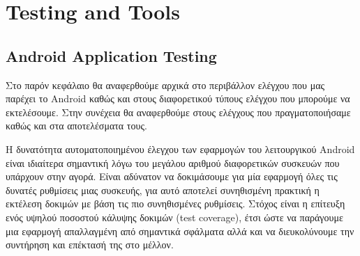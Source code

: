 %

	\section{Testing and Tools}
	
	\subsection{Android Application Testing}
	
	Στο παρόν κεφάλαιο θα αναφερθούμε αρχικά στο περιβάλλον ελέγχου που μας παρέχει το Android καθώς και στους διαφορετικού τύπους ελέγχου που μπορούμε να εκτελέσουμε. Στην συνέχεια θα αναφερθούμε στους ελέγχους που πραγματοποιήσαμε καθώς και στα αποτελέσματα τους.
	
	Η δυνατότητα αυτοματοποιημένου έλεγχου των εφαρμογών του λειτουργικού Android είναι ιδιαίτερα σημαντική λόγω του μεγάλου αριθμού διαφορετικών συσκευών που υπάρχουν στην αγορά. Είναι αδύνατον να δοκιμάσουμε για μία εφαρμογή όλες τις δυνατές ρυθμίσεις μιας συσκευής, για αυτό αποτελεί συνηθισμένη πρακτική η εκτέλεση δοκιμών με βάση τις πιο συνηθισμένες ρυθμίσεις. Στόχος είναι η επίτευξη ενός υψηλού ποσοστού κάλυψης δοκιμών (test coverage), έτσι ώστε να παράγουμε μια εφαρμογή απαλλαγμένη από σημαντικά σφάλματα αλλά και να διευκολύνουμε την συντήρηση και επέκτασή της στο μέλλον.
	

